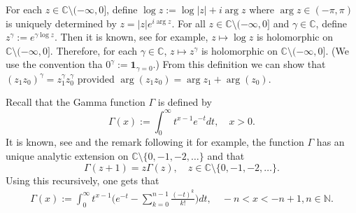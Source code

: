\documentclass[12pt,a4paper]{amsart}
\theoremstyle{plain}
\theoremstyle{definition}
\numberwithin{equation}{section}
\begin{document}
	For each $z\in \mathbb C\setminus (-\infty,0]$, define
$
	\log z := \log |z| + i \arg z
$
	where $\arg z \in (-\pi,\pi)$ is uniquely determined by
$
	z = |z|e^{i \arg z}.
$ 	
	For all $z\in \mathbb C\setminus (-\infty,0]$ and $\gamma \in \mathbb C$, define
$
	z^\gamma := e^{\gamma \log z}.
$
	Then it is known, see \cite[Theorem 6.1]{SteinShakarchi2003Complex} for example, $z\mapsto \log z$ is holomorphic on $\mathbb C\setminus (-\infty,0]$.
	Therefore, for each $\gamma \in \mathbb C$, $z\mapsto z^\gamma$ is holomorphic on $\mathbb C\setminus (-\infty,0]$.
(We use the convention tha  $0^\gamma := \mathbf 1_{\gamma = 0}$.)
    From this definition we can show that $(z_1z_0)^\gamma = z_1^\gamma z_0^\gamma$ provided $\arg (z_1z_0)=\arg z_1 + \arg(z_0)$.

 Recall that the Gamma function  $\Gamma$ is defined by
\begin{equation}
    \Gamma (x) := \int_0^\infty t^{x-1} e^{-t}dt,
    \quad x>0.
\end{equation}
	It is known, see \cite[Theorem 6.1.3]{SteinShakarchi2003Complex} and the remark following it for example, the function $\Gamma$ has an unique analytic extension on $\mathbb C\setminus\{0, -1,-2,\dots\}$ and that
\[
	\Gamma(z+1) = z \Gamma(z),\quad z\in \mathbb C\setminus\{0, -1,-2,\dots\}.
\]
	Using this recursively, one gets that
\begin{equation}\begin{split}
\label{eq: definition of Gamma function}
    \Gamma(x)
    := \int_0^\infty t^{x-1} \Big(e^{-t} - \sum_{k=0}^{n-1} \frac{(-t)^k}{k!}\Big) dt,
    \quad -n< x< -n+1, n\in \mathbb N.
\end{split}\end{equation}
\end{document}
